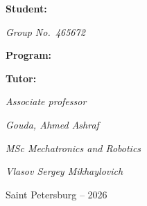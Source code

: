 \documentclass[12pt,a4paper]{article}
\begin{document}
\begin{titlepage}
    \vfill

    \noindent
    \begin{minipage}[t]{0.36\textwidth}
        \raggedright
        {\large\textbf{Student:}\par}
        \vspace{0.18cm}
        {\large\textit{Group No.\ 465672}\par}

        \vspace{0.48cm}

        {\large\textbf{Program:}\par}

        \vspace{0.62cm}

        {\large\textbf{Tutor:}\par}
        \vspace{0.18cm}
        {\large\textit{Associate professor}\par}
    \end{minipage}
    \hfill
    \begin{minipage}[t]{0.46\textwidth}
        \raggedleft
        {\large\textit{Gouda, Ahmed Ashraf}\par}

        \vspace{1.10cm}

        {\large\textit{MSc Mechatronics and Robotics}\par}

        \vspace{0.95cm}

        {\large\textit{Vlasov Sergey Mikhaylovich}\par}
    \end{minipage}

    \vfill

    \begin{center}
        {\large Saint Petersburg -- 2026\par}
    \end{center}
\end{titlepage}
\hypersetup{pageanchor=true}

\tableofcontents
\clearpage
\end{document}
